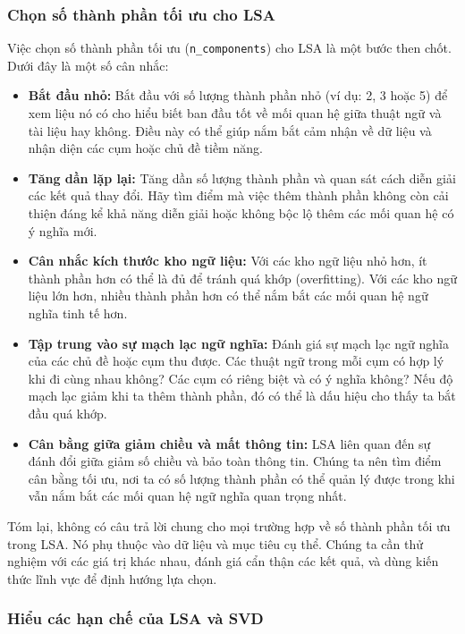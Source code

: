 \subsubsection*{Chọn số thành phần tối ưu cho LSA}

Việc chọn số thành phần tối ưu (\texttt{n\_components}) cho LSA là một bước then chốt. Dưới đây là một số cân nhắc:

\begin{itemize}
  \item \textbf{Bắt đầu nhỏ:} Bắt đầu với số lượng thành phần nhỏ (ví dụ: 2, 3 hoặc 5) để xem liệu nó có cho hiểu biết ban đầu tốt về mối quan hệ giữa thuật ngữ và tài liệu hay không. Điều này có thể giúp nắm bắt cảm nhận về dữ liệu và nhận diện các cụm hoặc chủ đề tiềm năng.
  \item \textbf{Tăng dần lặp lại:} Tăng dần số lượng thành phần và quan sát cách diễn giải các kết quả thay đổi. Hãy tìm điểm mà việc thêm thành phần không còn cải thiện đáng kể khả năng diễn giải hoặc không bộc lộ thêm các mối quan hệ có ý nghĩa mới.
  \item \textbf{Cân nhắc kích thước kho ngữ liệu:} Với các kho ngữ liệu nhỏ hơn, ít thành phần hơn có thể là đủ để tránh quá khớp (overfitting). Với các kho ngữ liệu lớn hơn, nhiều thành phần hơn có thể nắm bắt các mối quan hệ ngữ nghĩa tinh tế hơn.
  \item \textbf{Tập trung vào sự mạch lạc ngữ nghĩa:} Đánh giá sự mạch lạc ngữ nghĩa của các chủ đề hoặc cụm thu được. Các thuật ngữ trong mỗi cụm có hợp lý khi đi cùng nhau không? Các cụm có riêng biệt và có ý nghĩa không? Nếu độ mạch lạc giảm khi ta thêm thành phần, đó có thể là dấu hiệu cho thấy ta bắt đầu quá khớp.
  \item \textbf{Cân bằng giữa giảm chiều và mất thông tin:} LSA liên quan đến sự đánh đổi giữa giảm số chiều và bảo toàn thông tin. Chúng ta nên tìm điểm cân bằng tối ưu, nơi ta có số lượng thành phần có thể quản lý được trong khi vẫn nắm bắt các mối quan hệ ngữ nghĩa quan trọng nhất.
\end{itemize}

Tóm lại, không có câu trả lời chung cho mọi trường hợp về số thành phần tối ưu trong LSA. Nó phụ thuộc vào dữ liệu và mục tiêu cụ thể. Chúng ta cần thử nghiệm với các giá trị khác nhau, đánh giá cẩn thận các kết quả, và dùng kiến thức lĩnh vực để định hướng lựa chọn.

\subsubsection*{Hiểu các hạn chế của LSA và SVD}

